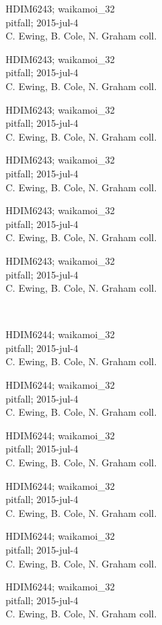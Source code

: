 \documentclass[2pt]{extarticle}
\begin{document}
\noindent
\parbox{0.16\textwidth}{\tiny \raggedright \rule[-0.3\baselineskip]{0pt}{10pt}HDIM6243; waikamoi\_32\\ pitfall; 2015-jul-4\\ C. Ewing, B. Cole, N. Graham coll.}
\parbox{0.16\textwidth}{\tiny \raggedright \rule[-0.3\baselineskip]{0pt}{10pt}HDIM6243; waikamoi\_32\\ pitfall; 2015-jul-4\\ C. Ewing, B. Cole, N. Graham coll.}
\parbox{0.16\textwidth}{\tiny \raggedright \rule[-0.3\baselineskip]{0pt}{10pt}HDIM6243; waikamoi\_32\\ pitfall; 2015-jul-4\\ C. Ewing, B. Cole, N. Graham coll.}
\parbox{0.16\textwidth}{\tiny \raggedright \rule[-0.3\baselineskip]{0pt}{10pt}HDIM6243; waikamoi\_32\\ pitfall; 2015-jul-4\\ C. Ewing, B. Cole, N. Graham coll.}
\parbox{0.16\textwidth}{\tiny \raggedright \rule[-0.3\baselineskip]{0pt}{10pt}HDIM6243; waikamoi\_32\\ pitfall; 2015-jul-4\\ C. Ewing, B. Cole, N. Graham coll.}
\parbox{0.16\textwidth}{\tiny \raggedright \rule[-0.3\baselineskip]{0pt}{10pt}HDIM6243; waikamoi\_32\\ pitfall; 2015-jul-4\\ C. Ewing, B. Cole, N. Graham coll.} \\ 
\vspace{0.001in} 

\noindent
\parbox{0.16\textwidth}{\tiny \raggedright \rule[-0.3\baselineskip]{0pt}{10pt}HDIM6244; waikamoi\_32\\ pitfall; 2015-jul-4\\ C. Ewing, B. Cole, N. Graham coll.}
\parbox{0.16\textwidth}{\tiny \raggedright \rule[-0.3\baselineskip]{0pt}{10pt}HDIM6244; waikamoi\_32\\ pitfall; 2015-jul-4\\ C. Ewing, B. Cole, N. Graham coll.}
\parbox{0.16\textwidth}{\tiny \raggedright \rule[-0.3\baselineskip]{0pt}{10pt}HDIM6244; waikamoi\_32\\ pitfall; 2015-jul-4\\ C. Ewing, B. Cole, N. Graham coll.}
\parbox{0.16\textwidth}{\tiny \raggedright \rule[-0.3\baselineskip]{0pt}{10pt}HDIM6244; waikamoi\_32\\ pitfall; 2015-jul-4\\ C. Ewing, B. Cole, N. Graham coll.}
\parbox{0.16\textwidth}{\tiny \raggedright \rule[-0.3\baselineskip]{0pt}{10pt}HDIM6244; waikamoi\_32\\ pitfall; 2015-jul-4\\ C. Ewing, B. Cole, N. Graham coll.}
\parbox{0.16\textwidth}{\tiny \raggedright \rule[-0.3\baselineskip]{0pt}{10pt}HDIM6244; waikamoi\_32\\ pitfall; 2015-jul-4\\ C. Ewing, B. Cole, N. Graham coll.} \\ 
\vspace{0.001in} 
\end{document}
